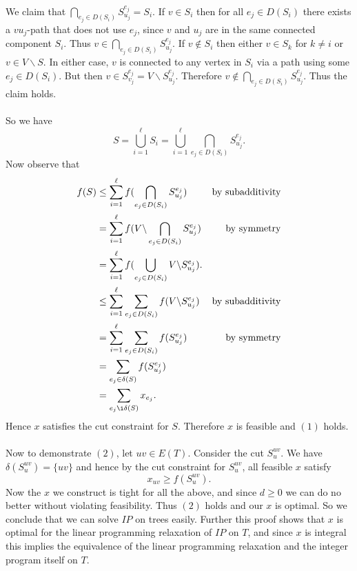 \documentclass[letterpaper,12pt,oneside,onecolumn]{article}
\begin{document}
\paragraph{}
We claim that $\bigcap_{e_j \in D(S_i)} S^{e_j}_{u_j} = S_i.$ If $v \in S_i$ then for all $e_j \in D(S_i)$ there exists a $vu_j$-path that does not use $e_j$, since $v$ and $u_j$ are in the same connected component $S_i$. Thus $v \in \bigcap_{e_j \in D(S_i)}S^{e_j}_{u_j}$. If $v \not\in S_i$ then either $v \in S_{k}$ for $k \neq i$ or $v \in V\backslash S$. In either case, $v$ is connected to any vertex in $S_i$ via a path using some $e_j \in D(S_i)$. But then $v \in S^{e_j}_{v_j} = V \backslash S^{e_j}_{u_j}$. Therefore $v \not\in \bigcap_{e_j \in D(S_i)}S^{e_j}_{u_j}$. Thus the claim holds.
\paragraph{}
So we have $$S = \bigcup_{i=1}^\ell S_i = \bigcup_{i=1}^\ell \bigcap_{e_j \in D(S_i)}S^{e_j}_{u_j}.$$ Now observe that
\begin{align*}
f(S) &\leq \sum_{i=1}^\ell f(\bigcap_{e_j \in D(S_i)}S^{e_j}_{u_j}) &\text{by subadditivity} \\
&= \sum_{i=1}^\ell f(V\backslash \bigcap_{e_j \in D(S_i)} S^{e_j}_{u_j}) &\text{by symmetry} \\
&= \sum_{i=1}^\ell f(\bigcup_{e_j\in D(S_i)} V\backslash S^{e_j}_{u_j}). \\
&\leq \sum_{i=1}^\ell \sum_{e_j \in D(S_i)} f(V\backslash S^{e_j}_{u_j}) &\text{by subadditivity} \\ 
&= \sum_{i=1}^\ell \sum_{e_j \in D(S_i)} f(S^{e_j}_{u_j}) &\text{by symmetry} \\
&= \sum_{e_j \in \delta(S)} f(S^{e_j}_{u_j}) \\
&= \sum_{e_j \i \delta(S)} x_{e_j}.
\end{align*}
Hence $x$ satisfies the cut constraint for $S$. Therefore $x$ is feasible and $(1)$ holds.
\paragraph{}
Now to demonstrate $(2)$, let $uv \in E(T)$. Consider the cut $S^{uv}_u$. We have $\delta(S^{uv}_u) = \{uv\}$ and hence by the cut constraint for $S^{uv}_u$, all feasible $x$ satisfy
$$x_{uv} \geq f(S^{uv}_u).$$
Now the $x$ we construct is tight for all the above, and since $d \geq 0$ we can do no better without violating feasibility. Thus $(2)$ holds and our $x$ is optimal. So we conclude that we can solve $IP$ on trees easily. Further this proof shows that $x$ is optimal for the linear programming relaxation of $IP$ on $T$, and since $x$ is integral this implies the equivalence of the linear programming relaxation and the integer program itself on $T$.
\end{document}
